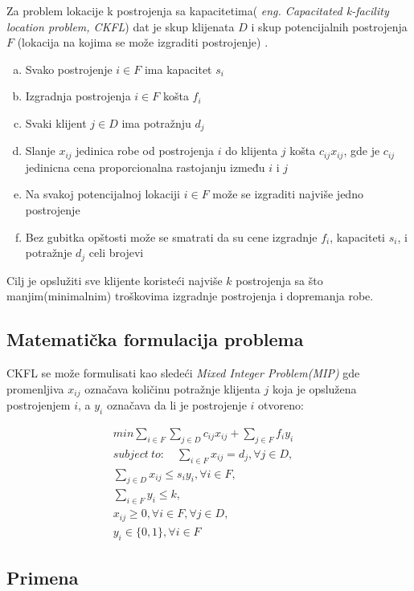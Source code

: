 \documentclass[a4paper]{article}
\begin{document}
Za problem lokacije k postrojenja sa kapacitetima( \emph{eng. Capacitated k-facility location problem, CKFL}) dat je skup klijenata $D$ i skup potencijalnih postrojenja $F$ (lokacija na kojima se može izgraditi postrojenje) \cite{original}.
\begin{enumerate}[a)]
\item Svako postrojenje $i \in F$ ima kapacitet $s_i$
\item Izgradnja postrojenja $i \in F$ košta $f_i$
\item Svaki klijent $j \in D$ ima potražnju $d_j$
\item Slanje $x_{ij}$ jedinica robe od postrojenja $i$ do klijenta $j$ košta $c_{ij}x_{ij}$, gde je $c_{ij}$ jedinicna cena proporcionalna rastojanju između $i$ i $j$
\item Na svakoj potencijalnoj lokaciji $i \in F$ može se izgraditi najviše jedno postrojenje
\item Bez gubitka opštosti može se smatrati da su cene izgradnje $f_i$, kapaciteti $s_i$, i potražnje $d_j$ celi brojevi

\end{enumerate}
Cilj je opslužiti sve klijente koristeći najviše $k$ postrojenja sa što manjim(minimalnim) troškovima izgradnje postrojenja i dopremanja robe.

\subsection{Matematička formulacija problema}
CKFL se može formulisati kao sledeći \emph{Mixed Integer Problem(MIP)} gde promenljiva $x_{ij}$ označava količinu potražnje klijenta $j$ koja je opslužena postrojenjem $i$, a $y_i$ označava da li je postrojenje $i$ otvoreno\cite{original}:

\begin{align}
min \sum_{i \in F}\sum_{j \in D}c_{ij}x_{ij} + \sum_{j \in F}f_iy_i\\
 subject\: to: 
\quad \sum_{i \in F}x_{ij} = d_j, \forall j \in D,\quad\\
 \sum_{j \in D}x_{ij} \le s_iy_i, \forall i \in F,\\
\sum_{i \in F}y_i \le k,\\
x_{ij} \ge 0, \forall i \in F,\forall j \in D,\\
y_i \in \{ 0 , 1 \}, \forall i \in F
\end{align}

\subsection{Primena}
\end{document}
